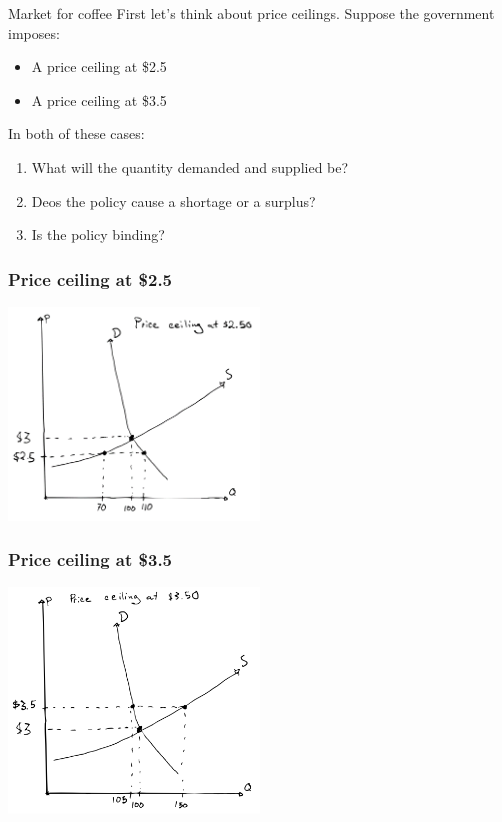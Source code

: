 \documentclass[aspectratio=169]{beamer}
\begin{document}
\begin{frame}{Market for coffee}
    First let's think about price ceilings. Suppose the government imposes:
    \begin{itemize}
        \item A price ceiling at \$2.5
        \item A price ceiling at \$3.5
    \end{itemize}

    \vspace{5mm}

    In both of these cases:
    \begin{enumerate}
        \item What will the quantity demanded and supplied be?
        \item Deos the policy cause a shortage or a surplus?
        \item Is the policy binding?
    \end{enumerate}
\end{frame}

\begin{frame}
    \frametitle{Price ceiling at \$2.5}
    \centering
    \includegraphics[width = 0.5\textwidth,keepaspectratio]{coffee_ceiling_250.png}
\end{frame}

\begin{frame}
    \frametitle{Price ceiling at \$3.5}
    \centering
    \includegraphics[width = 0.5\textwidth,keepaspectratio]{coffee_ceiling_350.png}
\end{frame}
\end{document}

